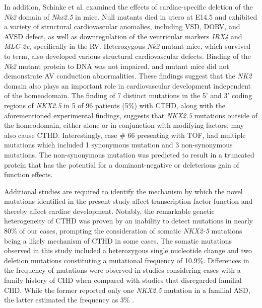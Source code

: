 \begin{refsection}
In addition, Schinke et al. \cite{schinke2001lack} examined the effects of cardiac-speciﬁc deletion of the \textit{Nk2} domain of \textit{Nkx2.5} in mice. Null mutants died in utero at E14.5 and exhibited a variety of structural cardiovascular anomalies, including VSD, DORV, and AVSD defect, as well as downregulation of the ventricular markers \textit{IRX4} and \textit{MLC-2v}, specifically in the RV. Heterozygous \textit{Nk2} mutant mice, which survived to term, also developed various structural cardiovascular defects. Binding of the \textit{Nk2} mutant protein to DNA was not impaired, and mutant mice did not demonstrate AV conduction abnormalities. These findings suggest that the \textit{NK2} domain also plays an important role in cardiovascular development independent of the homeodomain. The finding of 7 distinct mutations in the 5’ and 3’ coding regions of \textit{NKX2.5} in 5 of 96 patients (5\%) with CTHD, along with the aforementioned experimental ﬁndings, suggests that \textit{NKX2.5} mutations outside of the homeodomain, either alone or in conjunction with modifying factors, may also cause CTHD.  Interestingly, case \# 66 presenting with TOF, had multiple mutations which included 1 synonymous mutation and 3 non-synonymous mutations. The non-synonymous mutation was predicted to result in a truncated protein that has the potential for a dominant-negative or deleterious gain of function effects.

Additional studies are required to identify the mechanism by which the novel mutations identified in the present study affect transcription factor function and thereby affect cardiac development. Notably, the remarkable genetic heterogeneity of CTHD was proven by an inability to detect mutations in nearly 80\% of our cases, prompting the consideration of somatic \textit{NKX2-5} mutations being a likely mechanism of CTHD in some cases. The somatic mutations observed in this study included a heterozygous single nucleotide change and two deletion mutations constituting a mutational frequency of 10.9\%. Differences in the frequency of mutations were observed in studies considering cases with a family history of CHD when compared with studies that disregarded familial CHD. While the former reported only one \textit{NKX2.5} mutation in a familial ASD, the latter estimated the frequency as 3\% \cite{mcelhinney2003nkx2,dinesh2010single}.


\end{refsection}
